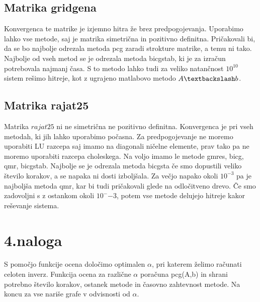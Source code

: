 \documentclass[11pt]{article} %
\begin{document}
\subsection{Matrika gridgena}

Konvergenca te matrike je izjemno hitra že brez predpogojevanja. Uporabimo lahko vse metode, saj je matrika simetrična in pozitivno definitna. Pričakovali bi, da se bo najbolje odrezala metoda pcg zaradi strokture matrike, a temu ni tako. Najbolje od vseh metod se je odrezala metoda bicgstab, ki je za izračun potrebovala najmanj časa. S to metodo lahko tudi za veliko natančnost $10^{10}$ sistem rešimo hitreje, kot z ugrajeno matlabovo metodo $A\textbackslash b$.

\subsection{Matrika rajat25}

Matrika $rajat25$ ni ne simetrična ne pozitivno definitna. Konvergenca je pri vseh metodah, ki jih lahko uporabimo počasna. Za predpogojevanje ne moremo uporabiti LU razcepa saj imamo na diagonali ničelne elemente, prav tako pa ne moremo uporabiti razcepa choleskega.  Na voljo imamo le metode gmres, bicg, qmr, bicgstab. Najbolje se je odrezala metoda bicgsta če smo dopustili veliko število korakov, a se napaka ni dosti izboljšala. Za večjo napako okoli $10^{-3}$ pa je najboljša metoda qmr, kar bi tudi pričakovali glede na odločitveno drevo. Če smo zadovoljni s z ostankom okoli $10^-{-3}$, potem vse metode delujejo hitreje kakor reševanje sistema.

\section{4.naloga}

S pomočjo funkcije ocena določimo optimalen $\alpha$, pri katerem želimo računati celoten inverz. Funkcija ocena za različne $\alpha$  poračuna pcg(A,b) in shrani potrebno število korakov, ostanek metode in časovno zahtevnost metode. Na koncu za vse nariše grafe v odvisnosti od $\alpha$. 
\end{document}
